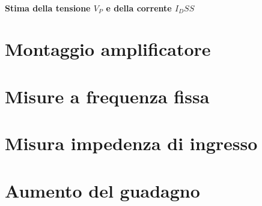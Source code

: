 \documentclass[10pt,a4paper]{article}
\begin{document}
\paragraph{Stima della tensione $V_P$ e della corrente $I_DSS$}

\section{Montaggio amplificatore}

\section{Misure a frequenza fissa}
\section{Misura impedenza di ingresso}
\section{Aumento del guadagno}
\end{document}
